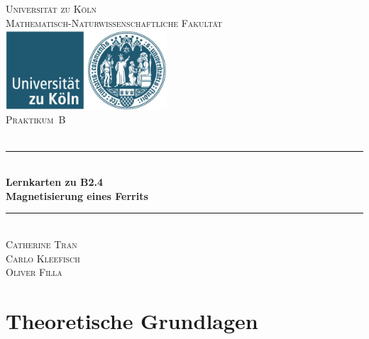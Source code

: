 \documentclass[12pt,a4paper]{scrartcl}
\numberwithin{equation}{section} %
\newcommand{\HRule}{\rule{\linewidth}{0.7mm}}
\begin{document}
\begin{titlepage}
	\pagestyle{empty}

	\begin{center}

	\textsc{\LARGE Universität zu Köln }\\ [0.4cm]
	\textsc{Mathematisch-Naturwissenschaftliche Fakultät} \\[1.5cm]

	\includegraphics[width=0.45\textwidth]{../media/uni.jpg}\\[1.5cm]  %

	\textsc{\Large Praktikum~B}\\[2mm]
	\textsc{}\\[10mm]
	\HRule \\[0.4cm]

		{	\Huge \bfseries Lernkarten zu B2.4}\\[0.4cm]
			{	\huge \bfseries Magnetisierung eines Ferrits}\\[0.3cm]
	
	\HRule \\[3cm]

			\textsc{\Large Catherine Tran } \\[3pt]
		\textsc{\Large Carlo Kleefisch } \\[3pt]
		\textsc{\Large Oliver Filla } \\[3pt]
		
	\end{center}
\end{titlepage}

\newpage
\tableofcontents
\newpage

\hypertarget{theoretische-grundlagen}{%
\section{Theoretische Grundlagen}\label{theoretische-grundlagen}}
\end{document}
